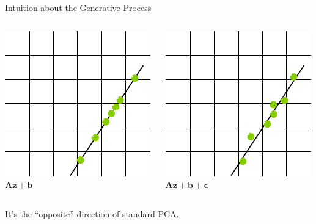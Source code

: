 \documentclass{beamer}
\newcommand{\bs}[1]{\boldsymbol{#1}}
\begin{document}
\begin{frame}{Intuition about the Generative Process}
\begin{columns}[b]
\begin{column}{0.22\textwidth}
  \includegraphics[width=\textwidth]{fig/ppca_generation_3.pdf}\\ $\bs{A}\bs{z}+\bs{b}$
 \end{column}\hfill
  \begin{column}{0.22\textwidth}
  \centering
  \includegraphics[width=\textwidth]{fig/ppca_generation_4.pdf}\\ $\bs{A}\bs{z}+\bs{b}+\bs{\epsilon}$
 \end{column}
\end{columns}\vspace{\baselineskip}
It's the ``opposite'' direction of standard PCA.
\end{frame}
\end{document}
